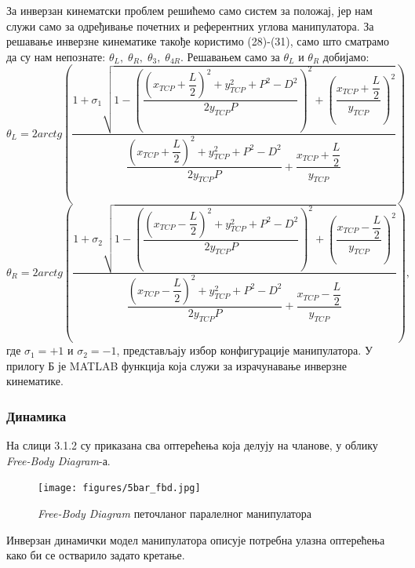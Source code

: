 \documentclass[12pt]{article}
\begin{document}
За инверзан кинематски проблем решићемо само систем за положај, јер нам служи само за одређивање почетних и референтних углова манипулатора. За решавање инверзне кинематике такође користимо (28)-(31), само што сматрамо да су нам непознате: $\theta_L,\;\theta_R,\;\theta_3,\;\theta_{4R}$. Решавањем само за $\theta_L$ и $\theta_R$ добијамо:
\begin{equation}
    \theta_L = 2arctg\left(\dfrac{1 + \sigma_1\sqrt{1 - \left(\dfrac{\left(x_{TCP}+\dfrac{L}{2}\right)^2 + y_{TCP}^2 + P^2 - D^2}{2y_{TCP}P}\right)^2+\left(\dfrac{x_{TCP}+\dfrac{L}{2}}
    {y_{TCP}}\right)^2}}
    {\dfrac{\left(x_{TCP}+\dfrac{L}{2}\right)^2 + y_{TCP}^2 + P^2 - D^2}{2y_{TCP}P} + \dfrac{x_{TCP}+\dfrac{L}{2}}
    {y_{TCP}}}\right)
\end{equation}
\begin{equation}
    \theta_R = 2arctg\left(\dfrac{1 + \sigma_2\sqrt{1 - \left(\dfrac{\left(x_{TCP}-\dfrac{L}{2}\right)^2 + y_{TCP}^2 + P^2 - D^2}{2y_{TCP}P}\right)^2+\left(\dfrac{x_{TCP}-\dfrac{L}{2}}
    {y_{TCP}}\right)^2}}
    {\dfrac{\left(x_{TCP}-\dfrac{L}{2}\right)^2 + y_{TCP}^2 + P^2 - D^2}{2y_{TCP}P} + \dfrac{x_{TCP}-\dfrac{L}{2}}
    {y_{TCP}}}\right),
\end{equation}
где $\sigma_1=+1$ и $\sigma_2=-1$, представљају избор конфигурације манипулатора.
У прилогу Б је MATLAB функција која служи за израчунавање инверзне кинематике.

\newpage
\subsubsection{Динамика}
На слици 3.1.2 су приказана сва оптерећења која делују на чланове, у облику \textit{Free-Body Diagram}-а.
\begin{figure}[H]
    \centering
    \texttt{[image: figures/5bar\_fbd.jpg]}
    \caption{\textit{Free-Body Diagram} петочланог паралелног манипулатора}
    \label{fig:5bar_fbd}
\end{figure}

Инверзан динамички модел манипулатора описује потребна улазна оптерећења како би се остварило задато кретање.
\end{document}
